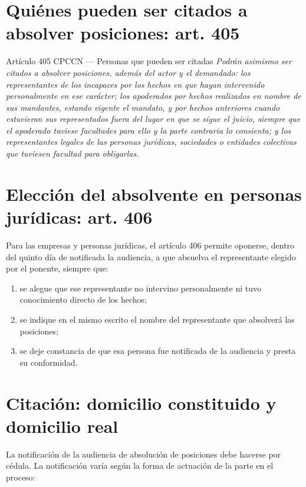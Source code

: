 \documentclass[12pt,oneside]{book}
\begin{document}
\section{Quiénes pueden ser citados a absolver posiciones: art. 405}

\begin{norma}{Artículo 405 CPCCN --- Personas que pueden ser citadas}
\textit{Podrán asimismo ser citados a absolver posiciones, además del actor y el demandado: los representantes de los incapaces por los hechos en que hayan intervenido personalmente en ese carácter; los apoderados por hechos realizados en nombre de sus mandantes, estando vigente el mandato, y por hechos anteriores cuando estuvieran sus representados fuera del lugar en que se sigue el juicio, siempre que el apoderado tuviese facultades para ello y la parte contraria lo consienta; y los representantes legales de las personas jurídicas, sociedades o entidades colectivas que tuviesen facultad para obligarlas.}
\end{norma}

\section{Elección del absolvente en personas jurídicas: art. 406}

Para las empresas y personas jurídicas, el artículo 406 permite oponerse, dentro del quinto día de notificada la audiencia, a que absuelva el representante elegido por el ponente, siempre que:
\begin{enumerate}
    \item se alegue que ese representante no intervino personalmente ni tuvo conocimiento directo de los hechos;
    \item se indique en el mismo escrito el nombre del representante que absolverá las posiciones;
    \item se deje constancia de que esa persona fue notificada de la audiencia y presta su conformidad.
\end{enumerate}

\section{Citación: domicilio constituido y domicilio real}

La notificación de la audiencia de absolución de posiciones debe hacerse por cédula. La notificación varía según la forma de actuación de la parte en el proceso:
\end{document}
